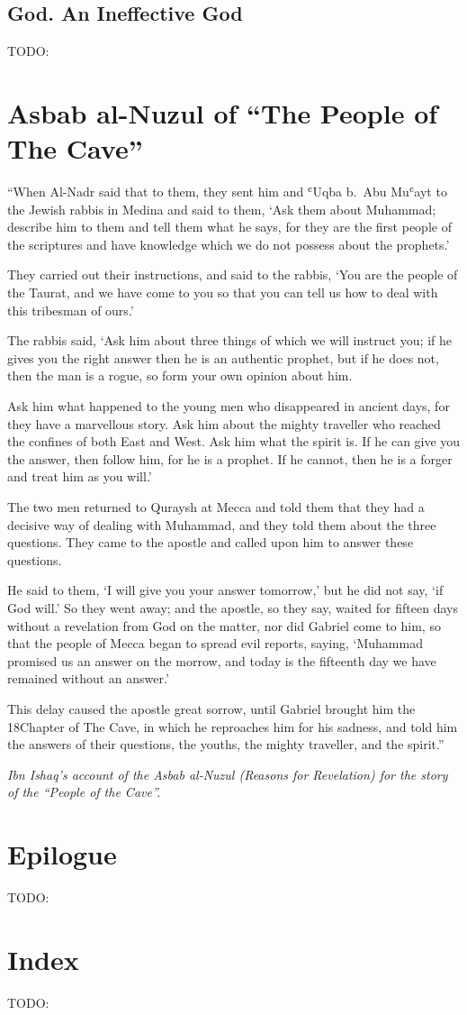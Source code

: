 \documentclass[12pt]{memoir}
\def\`{ʿ} %
\def\–{-\hskip0pt}
\newcommand{\QRef}[1]{{\color{darkblue}#1}}
\begin{document}
\section{God. An Ineffective God}
TODO:

\clearpage
\appendix
\addappheadtotoc

\chapter{Asbab al\–Nuzul of “The People of The Cave”}
\label{apdx:cave}

“When Al\–Nadr said that to them, they sent him and \`Uqba b.\ Abu Mu\`ayt
to the Jewish rabbis in Medina and said to them, ‘Ask them about Muhammad;
describe him to them and tell them what he says,
for they are the first people of the scriptures
and have knowledge which we do not possess about the prophets.’

They carried out their instructions, and said to the rabbis,
‘You are the people of the Taurat, and we have come to you
so that you can tell us how to deal with this tribesman of ours.’

The rabbis said, ‘Ask him about three things of which we will instruct you;
if he gives you the right answer then he is an authentic prophet,
but if he does not, then the man is a rogue,
so form your own opinion about him.

Ask him what happened to the young men who disappeared in ancient days,
for they have a marvellous story.
Ask him about the mighty traveller
who reached the confines of both East and West.
Ask him what the spirit is.
If he can give you the answer, then follow him, for he is a prophet.
If he cannot, then he is a forger and treat him as you will.’

The two men returned to Quraysh at Mecca and told them
that they had a decisive way of dealing with Muhammad,
and they told them about the three questions.
They came to the apostle and called upon him to answer these questions.

He said to them, ‘I will give you your answer tomorrow,’
but he did not say, ‘if God will.’
So they went away; and the apostle, so they say,
waited for fifteen days without a revelation from God on the matter,
nor did Gabriel come to him, so that the people of Mecca
began to spread evil reports, saying,
‘Muhammad promised us an answer on the morrow,
and today is the fifteenth day we have remained without an answer.’

This delay caused the apostle great sorrow,
until Gabriel brought him the \QRef{18}{Chapter of The Cave},
in which he reproaches him for his sadness,
and told him the answers of their questions, the youths,
the mighty traveller, and the spirit.”

\emph{Ibn Ishaq's account of the Asbab al\–Nuzul
(Reasons for Revelation) for the story of the “People of the Cave”.}


\backmatter

\chapter{Epilogue}
TODO:

\chapter{Index}
TODO:
\end{document}
